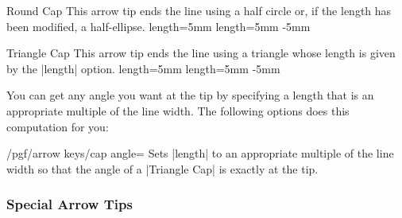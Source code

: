 \begin{arrowcap}{Round Cap}
  {
    This arrow tip ends the line using a half circle or, if the length
    has been modified, a half-ellipse.
  }
  {length=5mm}
  {length=5mm}
  {-5mm}
  \begin{arrowcapexamples}
    \arrowcapexample[]
    \arrowcapexample[reversed]
    \arrowcapexample[length=.5ex]
    \arrowcapexample[slant=.3]
  \end{arrowcapexamples}
\end{arrowcap}



\begin{arrowcap}{Triangle Cap}
  {
    This arrow tip ends the line using a triangle whose length is
    given by the |length| option.
  }
  {length=5mm}
  {length=5mm}
  {-5mm}

  You can get any angle you want at the tip by specifying a length
  that is an appropriate multiple of the line width. The following
  options does this computation for you:
  \begin{key}{/pgf/arrow keys/cap angle=}
    Sets |length| to an appropriate multiple of the line width so that
    the angle of a |Triangle Cap| is exactly  at the tip.
  \end{key}
  
  \begin{arrowcapexamples}
    \arrowcapexample[]
    \arrowcapexample[reversed]
    \arrowcapexample[cap angle=60]
    \arrowcapexample[cap angle=60,reversed]
    \arrowcapexample[length=.5ex]
    \arrowcapexample[slant=.3]
  \end{arrowcapexamples}
\end{arrowcap}


\subsubsection{Special Arrow Tips}

